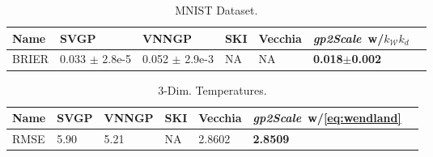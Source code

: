 \documentclass{article}
\begin{document}
\begin{table}[t!]
  \caption{MNIST Dataset.}
  \label{tbl:nist}
  \centering
  \begin{tabular}{lllllll}
    \toprule
    Name            & SVGP     & VNNGP   & SKI     & Vecchia & \emph{gp2Scale}~w/$k_{\mathcal{W}} k_{d}$ \\
    \midrule
    BRIER            &  0.033 $\pm$ 2.8e-5 &  0.052 $\pm$ 2.9e-3 & NA  &   NA    &   \textbf{0.018$\pm$0.002}  \\
    \bottomrule
  \end{tabular}
\end{table}
\begin{table}[t!]
  \caption{3-Dim. Temperatures.}
  \label{tbl:temps}
  \centering
  \begin{tabular}{lllllll}
    \toprule
    Name            & SVGP     & VNNGP & SKI & Vecchia & \emph{gp2Scale}~w/\eqref{eq:wendland} \\
    \midrule
    RMSE            &  5.90  &  5.21  & NA  &   2.8602 &  \textbf{2.8509} \\
    \bottomrule
  \end{tabular}
\end{table}
\end{document}
